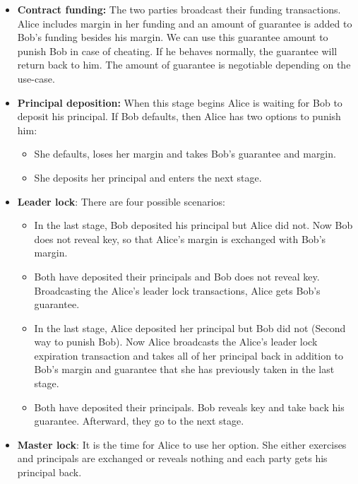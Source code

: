 \begin{itemize}
    \item \textbf{Contract funding:} The two parties broadcast their funding transactions. Alice includes margin in her funding and an amount of guarantee is added to Bob's funding besides his margin. We can use this guarantee amount to punish Bob in case of cheating. If he behaves normally, the guarantee will return back to him. The amount of guarantee is negotiable depending on the use-case.
    
    \item \textbf{Principal deposition:} When this stage begins Alice is waiting for Bob to deposit his principal. If Bob defaults, then Alice has two options to punish him:
    \begin{itemize}
        \item She defaults, loses her margin and takes Bob's guarantee and margin.
        \item She deposits her principal and enters the next stage.
    \end{itemize}

    \item \textbf{Leader lock}: 
    There are four possible scenarios:
    \begin{itemize}
        \item In the last stage, Bob deposited his principal but Alice did not. Now Bob does not reveal \keyone key, so that Alice's margin is exchanged with Bob's margin.
        \item Both have deposited their principals and Bob does not reveal \keyone key. Broadcasting the Alice's leader lock transactions, Alice gets Bob's guarantee.
        \item In the last stage, Alice deposited her principal but Bob did not (Second way to punish Bob). Now Alice broadcasts the Alice's leader lock expiration transaction and takes all of her principal back in addition to Bob's margin and guarantee that she has previously taken in the last stage. 
        \item Both have deposited their principals. Bob reveals \keyone key and take back his guarantee. Afterward, they go to the next stage.
    \end{itemize}
    
    \item \textbf{Master lock}: It is the time for Alice to use her option. She either exercises and principals are exchanged or reveals nothing and each party gets his principal back.
\end{itemize}


